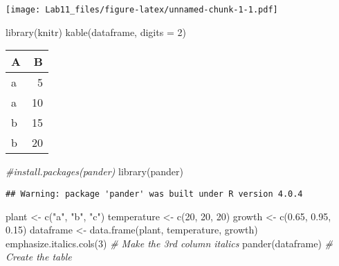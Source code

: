 \documentclass[
  12pt,
]{article}
\newenvironment{Shaded}{\begin{snugshade}}{\end{snugshade}}
\newcommand{\AttributeTok}[1]{\textcolor[rgb]{0.77,0.63,0.00}{#1}}
\newcommand{\CommentTok}[1]{\textcolor[rgb]{0.56,0.35,0.01}{\textit{#1}}}
\newcommand{\DecValTok}[1]{\textcolor[rgb]{0.00,0.00,0.81}{#1}}
\newcommand{\FloatTok}[1]{\textcolor[rgb]{0.00,0.00,0.81}{#1}}
\newcommand{\FunctionTok}[1]{\textcolor[rgb]{0.00,0.00,0.00}{#1}}
\newcommand{\NormalTok}[1]{#1}
\newcommand{\OtherTok}[1]{\textcolor[rgb]{0.56,0.35,0.01}{#1}}
\newcommand{\StringTok}[1]{\textcolor[rgb]{0.31,0.60,0.02}{#1}}
\begin{document}
\texttt{[image: Lab11\_files/figure-latex/unnamed-chunk-1-1.pdf]}

\begin{Shaded}
\begin{Highlighting}[]
\FunctionTok{library}\NormalTok{(knitr)}
\FunctionTok{kable}\NormalTok{(dataframe, }\AttributeTok{digits =} \DecValTok{2}\NormalTok{)}
\end{Highlighting}
\end{Shaded}

\begin{longtable}[]{@{}lr@{}}
\toprule
A & B\tabularnewline
\midrule
\endhead
a & 5\tabularnewline
a & 10\tabularnewline
b & 15\tabularnewline
b & 20\tabularnewline
\bottomrule
\end{longtable}

\begin{Shaded}
\begin{Highlighting}[]
\CommentTok{\#install.packages(pander)}
\FunctionTok{library}\NormalTok{(}\StringTok{\textasciigrave{}}\AttributeTok{pander}\StringTok{\textasciigrave{}}\NormalTok{)}
\end{Highlighting}
\end{Shaded}

\begin{verbatim}
## Warning: package 'pander' was built under R version 4.0.4
\end{verbatim}

\begin{Shaded}
\begin{Highlighting}[]
\NormalTok{plant }\OtherTok{\textless{}{-}} \FunctionTok{c}\NormalTok{(}\StringTok{"a"}\NormalTok{, }\StringTok{"b"}\NormalTok{, }\StringTok{"c"}\NormalTok{)}
\NormalTok{temperature }\OtherTok{\textless{}{-}} \FunctionTok{c}\NormalTok{(}\DecValTok{20}\NormalTok{, }\DecValTok{20}\NormalTok{, }\DecValTok{20}\NormalTok{)}
\NormalTok{growth }\OtherTok{\textless{}{-}} \FunctionTok{c}\NormalTok{(}\FloatTok{0.65}\NormalTok{, }\FloatTok{0.95}\NormalTok{, }\FloatTok{0.15}\NormalTok{)}
\NormalTok{dataframe }\OtherTok{\textless{}{-}} \FunctionTok{data.frame}\NormalTok{(plant, temperature, growth)}
\FunctionTok{emphasize.italics.cols}\NormalTok{(}\DecValTok{3}\NormalTok{)   }\CommentTok{\# Make the 3rd column italics}
\FunctionTok{pander}\NormalTok{(dataframe)           }\CommentTok{\# Create the table}
\end{Highlighting}
\end{Shaded}
\end{document}
